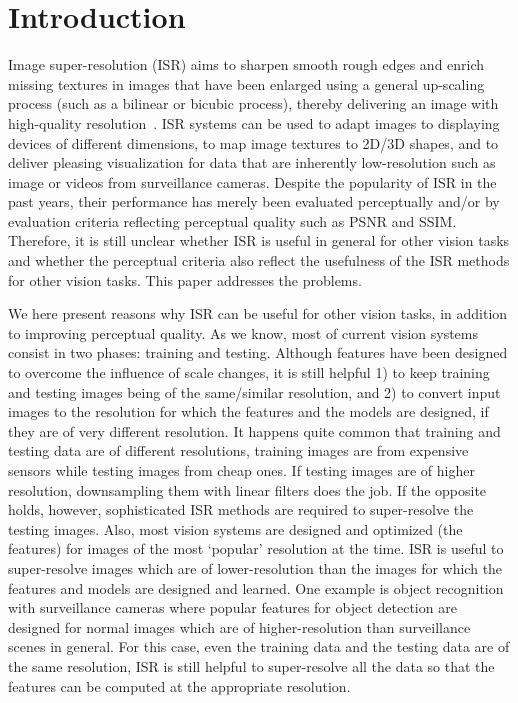 \documentclass[10pt,twocolumn,letterpaper]{article}
\begin{document}
\section{Introduction}
\label{sec:intro}
Image super-resolution (ISR) aims to sharpen smooth rough edges and
enrich missing textures in images that have been enlarged using a
general up-scaling process (such as a bilinear or bicubic process),
thereby delivering an image with high-quality
resolution~\cite{Freeman-CGA-2002, Yang-TIP-2010, Zeyde-CS-2012,
  Timofte-ICCV-2013, Dong-ECCV-2014, JOR:EG15}. ISR systems can be
used to adapt images to displaying devices of different dimensions, to
map image textures to 2D/3D shapes, and to deliver pleasing
visualization for data that are inherently low-resolution such as
image or videos from surveillance cameras.  Despite the popularity of
ISR in the past years, their performance has merely been evaluated
perceptually and/or by evaluation criteria reflecting perceptual
quality such as PSNR and SSIM. Therefore, it is still unclear whether
ISR is useful in general for other vision tasks and whether the
perceptual criteria also reflect the usefulness of the ISR methods for
other vision tasks. This paper addresses the problems.

We here present reasons why ISR can be useful for other vision tasks, in
addition to improving perceptual quality. As we know, most of current
vision systems consist in two phases: training and testing. Although
features have been designed to overcome the influence of scale
changes, it is still helpful 1) to keep training and testing images
being of the same/similar resolution, and 2) to convert input images to the resolution for which the features and the models
are designed, if they are of very different resolution.  It happens quite common that training and
testing data are of different resolutions, \eg training images are
from expensive sensors while testing images from cheap ones. If
testing images are of higher resolution, downsampling them
with linear filters does the job. If the opposite
holds, however, sophisticated ISR methods
are required to super-resolve the testing images. Also, most vision systems are designed and optimized
(\eg the features) for images of the most `popular' resolution at the
time. ISR is useful to super-resolve images which are of
lower-resolution than the images for which the features and models are designed and learned. One example is object recognition with surveillance cameras where popular features
for object detection are designed for normal images which are of
higher-resolution than surveillance scenes in general. For this case, even the
training data and the testing data are of the same resolution, ISR is
still helpful to super-resolve all the data so that
the features can be computed at the appropriate resolution. 
\end{document}
